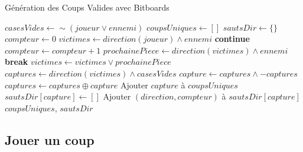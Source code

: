 \begin{algorithm}[H]
    \caption{Génération des Coups Valides avec Bitboards}
    \begin{algorithmic}[1]
        \State $casesVides \gets \sim(joueur \lor ennemi)$
        \State $coupsUniques \gets []$
        \State $sautsDir \gets \{\}$
            \State $compteur \gets 0$
            \State $victimes \gets direction(joueur) \land ennemi$
                \State \textbf{continue}
            \EndIf
                \State $compteur \gets compteur + 1$
                \State $prochainePiece \gets direction(victimes) \land ennemi$
                    \State \textbf{break}
                \EndIf
                \State $victimes \gets victimes \lor prochainePiece$
            \EndFor
            \State $captures \gets direction(victimes) \land casesVides$
                \State $capture \gets captures \land -captures$
                \State $captures \gets captures \oplus capture$
                    \State Ajouter $capture$ à $coupsUniques$
                    \State $sautsDir[capture] \gets []$
                \EndIf
                \State Ajouter $(direction, compteur)$ à $sautsDir[capture]$
            \EndWhile
        \EndFor
        \State \Return $coupsUniques$, $sautsDir$
    \EndFunction
    \end{algorithmic}
\end{algorithm}

\subsection{Jouer un coup}
\label{subsec:play}


